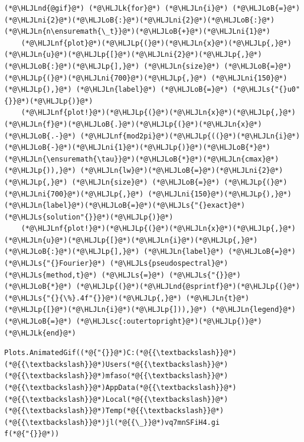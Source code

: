 \documentclass[12pt,a4paper]{article}
\newcommand{\HLJLk}[1]{\textcolor[RGB]{148,91,176}{\textbf{#1}}}
\newcommand{\HLJLn}[1]{#1}
\newcommand{\HLJLnd}[1]{\textcolor[RGB]{214,102,97}{#1}}
\newcommand{\HLJLnf}[1]{\textcolor[RGB]{66,102,213}{#1}}
\newcommand{\HLJLs}[1]{\textcolor[RGB]{201,61,57}{#1}}
\newcommand{\HLJLsc}[1]{\textcolor[RGB]{201,61,57}{#1}}
\newcommand{\HLJLni}[1]{\textcolor[RGB]{59,151,46}{#1}}
\newcommand{\HLJLoB}[1]{\textcolor[RGB]{102,102,102}{\textbf{#1}}}
\newcommand{\HLJLp}[1]{#1}
\begin{document}
\begin{lstlisting}
(*@\HLJLnd{@gif}@*) (*@\HLJLk{for}@*) (*@\HLJLn{i}@*) (*@\HLJLoB{=}@*) (*@\HLJLni{2}@*)(*@\HLJLoB{:}@*)(*@\HLJLni{2}@*)(*@\HLJLoB{:}@*)(*@\HLJLn{n\ensuremath{\_t}}@*)(*@\HLJLoB{+}@*)(*@\HLJLni{1}@*)
    (*@\HLJLnf{plot}@*)(*@\HLJLp{(}@*)(*@\HLJLn{x}@*)(*@\HLJLp{,}@*) (*@\HLJLn{u}@*)(*@\HLJLp{[}@*)(*@\HLJLni{2}@*)(*@\HLJLp{,}@*)(*@\HLJLoB{:}@*)(*@\HLJLp{],}@*) (*@\HLJLn{size}@*) (*@\HLJLoB{=}@*) (*@\HLJLp{(}@*)(*@\HLJLni{700}@*)(*@\HLJLp{,}@*) (*@\HLJLni{150}@*)(*@\HLJLp{),}@*) (*@\HLJLn{label}@*) (*@\HLJLoB{=}@*) (*@\HLJLs{"{}u0"{}}@*)(*@\HLJLp{)}@*)
    (*@\HLJLnf{plot!}@*)(*@\HLJLp{(}@*)(*@\HLJLn{x}@*)(*@\HLJLp{,}@*) (*@\HLJLn{f}@*)(*@\HLJLoB{.}@*)(*@\HLJLp{(}@*)(*@\HLJLn{x}@*) (*@\HLJLoB{.-}@*) (*@\HLJLnf{mod2pi}@*)(*@\HLJLp{((}@*)(*@\HLJLn{i}@*)(*@\HLJLoB{-}@*)(*@\HLJLni{1}@*)(*@\HLJLp{)}@*)(*@\HLJLoB{*}@*)(*@\HLJLn{\ensuremath{\tau}}@*)(*@\HLJLoB{*}@*)(*@\HLJLn{cmax}@*)(*@\HLJLp{)),}@*) (*@\HLJLn{lw}@*)(*@\HLJLoB{=}@*)(*@\HLJLni{2}@*)(*@\HLJLp{,}@*) (*@\HLJLn{size}@*) (*@\HLJLoB{=}@*) (*@\HLJLp{(}@*)(*@\HLJLni{700}@*)(*@\HLJLp{,}@*) (*@\HLJLni{150}@*)(*@\HLJLp{),}@*)(*@\HLJLn{label}@*)(*@\HLJLoB{=}@*)(*@\HLJLs{"{}exact}@*) (*@\HLJLs{solution"{}}@*)(*@\HLJLp{)}@*)
    (*@\HLJLnf{plot!}@*)(*@\HLJLp{(}@*)(*@\HLJLn{x}@*)(*@\HLJLp{,}@*) (*@\HLJLn{u}@*)(*@\HLJLp{[}@*)(*@\HLJLn{i}@*)(*@\HLJLp{,}@*)(*@\HLJLoB{:}@*)(*@\HLJLp{],}@*) (*@\HLJLn{label}@*) (*@\HLJLoB{=}@*) (*@\HLJLs{"{}Fourier}@*) (*@\HLJLs{pseudospectral}@*) (*@\HLJLs{method,t}@*) (*@\HLJLs{=}@*) (*@\HLJLs{"{}}@*) (*@\HLJLoB{*}@*) (*@\HLJLp{(}@*)(*@\HLJLnd{@sprintf}@*)(*@\HLJLp{(}@*)(*@\HLJLs{"{}{\%}.4f"{}}@*)(*@\HLJLp{,}@*) (*@\HLJLn{t}@*)(*@\HLJLp{[}@*)(*@\HLJLn{i}@*)(*@\HLJLp{])),}@*) (*@\HLJLn{legend}@*) (*@\HLJLoB{=}@*) (*@\HLJLsc{:outertopright}@*)(*@\HLJLp{)}@*)
(*@\HLJLk{end}@*)
\end{lstlisting}

\begin{lstlisting}
Plots.AnimatedGif((*@{"{}}@*)C:(*@{{\textbackslash}}@*)(*@{{\textbackslash}}@*)Users(*@{{\textbackslash}}@*)(*@{{\textbackslash}}@*)mfaso(*@{{\textbackslash}}@*)(*@{{\textbackslash}}@*)AppData(*@{{\textbackslash}}@*)(*@{{\textbackslash}}@*)Local(*@{{\textbackslash}}@*)(*@{{\textbackslash}}@*)Temp(*@{{\textbackslash}}@*)(*@{{\textbackslash}}@*)jl(*@{{\_}}@*)vq7mnSFiH4.gi
f(*@{"{}}@*))
\end{lstlisting}
\end{document}
